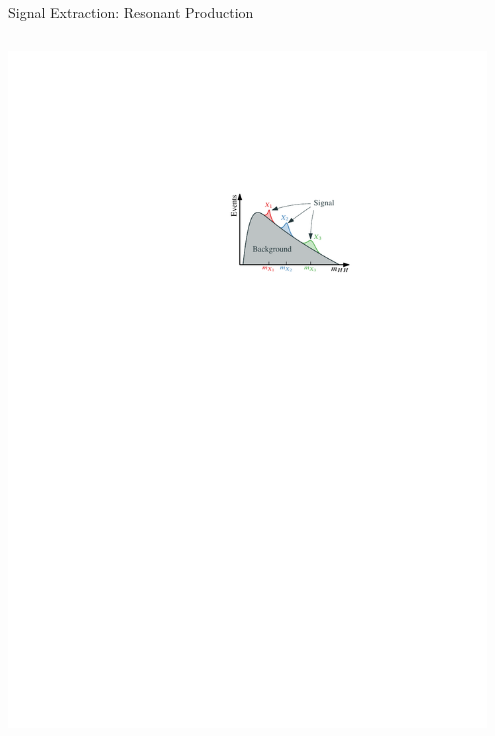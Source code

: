 \documentclass[11pt, xcolor={dvipsnames}, aspectratio=169]{beamer}
\begin{document}
\begin{frame}{Signal Extraction: Resonant \allbold{\HH} Production}
\begin{columns}[onlytextwidth]
    \includegraphics[width=0.95\textwidth]{resonant_signal_extraction_illustration}
  \end{columns}
\end{frame}


\end{document}
